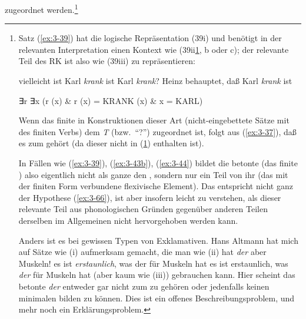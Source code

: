 \documentclass[output=paper]{langsci/langscibook}
\begin{document}
zugeordnet werden.\footnote{\label{fn:3-12b}%
	Satz (\ref{ex:3-39}) hat die logische Repräsentation (39i) und benötigt in der	
  relevanten Interpretation einen Kontext wie (39ii\ref{ex:3-fn12b39iia}, b oder c); der
  relevante Teil des RK ist also wie (39iii) zu repräsentieren:   
  
  \gblabelsep{1em}  
  \begin{exe}
  \begin{xlist}
  \ex\label{ex:3-fn12b39iia}%
  vielleicht ist Karl \textit{krank}
   \label{ex:3-fn12b39iib}                   %
  ist Karl \textit{krank}?
   \label{ex:3-fn12b39iic}                   %
  Heinz behauptet, daß Karl \textit{krank} ist
  \end{xlist}
  \label{ex:3-fn12b39iii}
  ∃r ∃x (r (x) \& r (x) = KRANK (x) \& x = KARL)
  \end{exe}
  Wenn das finite  in Konstruktionen dieser Art (nicht-eingebettete
  Sätze mit  des finiten Verbs) dem  \emph{T} (bzw.\ "`?"')
  zugeordnet ist, folgt aus (\ref{ex:3-37}), daß es zum  gehört (da dieser
   nicht in (\ref{ex:3-fn12b39iii}) enthalten ist).

  In Fällen wie (\ref{ex:3-39}), (\ref{ex:3-43b}), (\ref{ex:3-44}) bildet die betonte  (das
  finite ) also eigentlich nicht als ganze den , sondern nur
  ein Teil von ihr (das mit der finiten Form verbundene flexivische
  Element). Das entspricht nicht ganz der Hypothese (\ref{ex:3-66}), ist aber
  insofern leicht zu verstehen, als dieser relevante Teil aus
  phonologischen Gründen gegenüber anderen Teilen derselben 
   im Allgemeinen nicht hervorgehoben werden kann.

  Anders ist es bei gewissen Typen von Exklamativen. Hans Altmann hat
  mich auf Sätze wie (i) aufmerksam gemacht, die man wie (ii)
  \ea%
  \label{ex:3-fn12bi}
  hat \textit{der} aber Muskeln!
  \ex 
  \label{ex:3-fn12bii}
  es ist \textit{erstaunlich}, was der für Muskeln hat
  \ex
  \label{ex:3-fn12biii}
  es ist erstaunlich, was \textit{der} für Muskeln hat
  \z
  (aber kaum wie (iii)) gebrauchen kann. Hier scheint das betonte \textit{der}
  entweder gar nicht zum  zu gehören oder jedenfalls keinen
  minimalen  bilden zu können. Dies ist ein offenes
  Beschreibungsproblem, und mehr noch ein Erklärungsproblem.%
}
\end{document}
